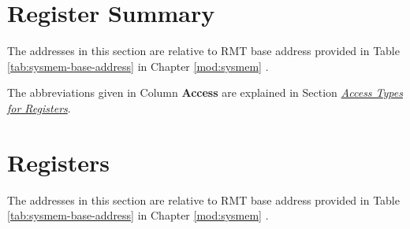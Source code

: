\documentclass[main\_\_EN.tex]{subfiles}
\begin{document}


\clearpage
\section{Register Summary}
\label{sec:rmt-reg-summ}
\hypertarget{rmt-reg-summ}{}

The addresses in this section are relative to RMT base address provided in Table  \ref{tab:sysmem-base-address} in Chapter  \ref{mod:sysmem} \textit{} .

The abbreviations given in Column \textbf{Access} are explained in Section \hyperref[glossary-access-types]{\textit{Access Types for Registers}}.








\section{Registers}

The addresses in this section are relative to RMT base address provided in Table  \ref{tab:sysmem-base-address} in Chapter  \ref{mod:sysmem} \textit{}.

\end{document}
